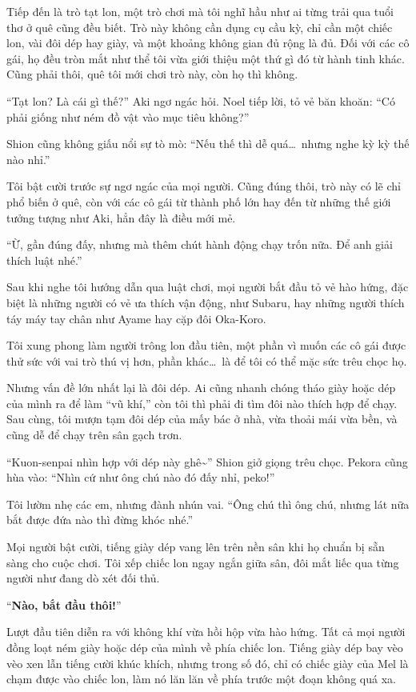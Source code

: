 \documentclass[../main.tex]{subfiles}
\begin{document}
\il

Tiếp đến là trò tạt lon, một trò chơi mà tôi nghĩ hầu như ai từng trải qua tuổi thơ ở quê cũng đều biết. Trò này không cần dụng cụ cầu kỳ, chỉ cần một chiếc lon, vài đôi dép hay giày, và một khoảng không gian đủ rộng là đủ. Đối với các cô gái, họ đều tròn mắt như thể tôi vừa giới thiệu một thứ gì đó từ hành tinh khác. Cũng phải thôi, quê tôi mới chơi trò này, còn họ thì không.

``Tạt lon? Là cái gì thế?'' Aki ngơ ngác hỏi. Noel tiếp lời, tỏ vẻ băn khoăn: ``Có phải giống như ném đồ vật vào mục tiêu không?''

Shion cũng không giấu nổi sự tò mò: ``Nếu thế thì dễ quá\dots\ nhưng nghe kỳ kỳ thế nào nhỉ.''

Tôi bật cười trước sự ngơ ngác của mọi người. Cũng đúng thôi, trò này có lẽ chỉ phổ biến ở quê, còn với các cô gái từ thành phố lớn hay đến từ những thế giới tưởng tượng như Aki, hẳn đây là điều mới mẻ.

``Ừ, gần đúng đấy, nhưng mà thêm chút hành động chạy trốn nữa. Để anh giải thích luật nhé.''

Sau khi nghe tôi hướng dẫn qua luật chơi, mọi người bắt đầu tỏ vẻ hào hứng, đặc biệt là những người có vẻ ưa thích vận động, như Subaru, hay những người thích táy máy tay chân như Ayame hay cặp đôi Oka-Koro.

Tôi xung phong làm người trông lon đầu tiên, một phần vì muốn các cô gái được thử sức với vai trò thú vị hơn, phần khác\dots\ là để tôi có thể mặc sức trêu chọc họ.

Nhưng vấn đề lớn nhất lại là đôi dép. Ai cũng nhanh chóng tháo giày hoặc dép của mình ra để làm ``vũ khí,'' còn tôi thì phải đi tìm đôi nào thích hợp để chạy. Sau cùng, tôi mượn tạm đôi dép của mấy bác ở nhà, vừa thoải mái vừa bền, và cũng dễ để chạy trên sân gạch trơn.

``Kuon-senpai nhìn hợp với dép này ghê\~{}'' Shion giở giọng trêu chọc. Pekora cũng hùa vào: ``Nhìn cứ như ông chú nào đó đấy nhỉ, peko!''

Tôi lườm nhẹ các em, nhưng đành nhún vai. ``Ông chú thì ông chú, nhưng lát nữa bắt được đứa nào thì đừng khóc nhé.''

Mọi người bật cười, tiếng giày dép vang lên trên nền sân khi họ chuẩn bị sẵn sàng cho cuộc chơi. Tôi xếp chiếc lon ngay ngắn giữa sân, đôi mắt liếc qua từng người như đang dò xét đối thủ.

``\textbf{Nào, bắt đầu thôi!}''


Lượt đầu tiên diễn ra với không khí vừa hồi hộp vừa hào hứng. Tất cả mọi người đồng loạt ném giày hoặc dép của mình về phía chiếc lon. Tiếng giày dép bay vèo vèo xen lẫn tiếng cười khúc khích, nhưng trong số đó, chỉ có chiếc giày của Mel là chạm được vào chiếc lon, làm nó lăn lăn về phía trước một đoạn không quá xa.
\end{document}
